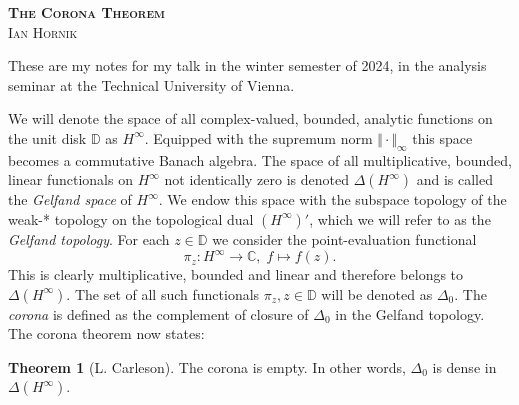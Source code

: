 \documentclass[letterpaper, 11pt]{article}
\newcommand{\C}{\mathbb{C}}
\newcommand{\D}{\mathbb{D}}
\newcommand{\1}{\mathds{1}}
\theoremstyle{definition}
\newtheorem{theorem}{Theorem}
\begin{document}
\author{\normalsize Ian Hornik}
\date{\vspace{-0.8em}\normalsize\today}


\begin{center}
  {\LARGE\scshape\bfseries{The Corona Theorem}} \\
  \scshape{Ian Hornik}
\end{center}

These are my notes for my talk in the winter semester of 2024, in the analysis seminar at the Technical University of Vienna.


We will denote the space of all complex-valued, bounded, analytic functions on the unit disk $\D$ as $H^\infty$. Equipped with the supremum norm $\Vert \cdot \Vert_\infty$ this space becomes a commutative Banach algebra. The space of all multiplicative, bounded, linear functionals on $H^\infty$ not identically zero is denoted $\Delta(H^\infty)$ and is called the \emph{Gelfand space} of $H^\infty$. We endow this space with the subspace topology of the weak\nobreakdash-* topology on the topological dual $(H^\infty)'$, which we will refer to as the \emph{Gelfand topology}. For each $z \in \D$ we consider the point-evaluation functional
\begin{equation*}
  \pi_z : H^\infty \to \C,\; f \mapsto f(z).
\end{equation*}
This is clearly multiplicative, bounded and linear and therefore belongs to $\Delta(H^\infty)$. The set of all such functionals $\pi_z, z \in \D$ will be denoted as $\Delta_0$. The \emph{corona} is defined as the complement of closure of $\Delta_0$ in the Gelfand topology. The corona theorem now states:

\begin{theorem}[L. Carleson] \label{thm:corona}
  The corona is empty. In other words, $\Delta_0$ is dense in $\Delta(H^\infty)$.
\end{theorem}
\end{document}
